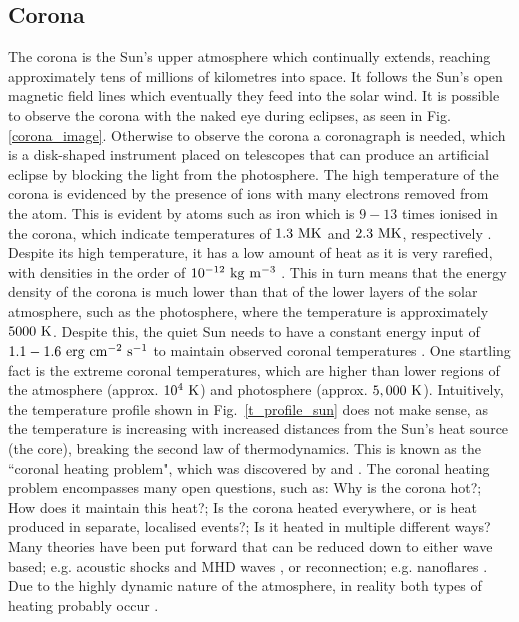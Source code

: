 \subsection{Corona}
\label{ssec:corona}
The corona is the Sun's upper atmosphere which continually extends, reaching approximately tens of millions of kilometres into space. It follows the Sun's open magnetic field lines which eventually they feed into the solar wind. It is possible to observe the corona with the naked eye during eclipses, as seen in Fig. \ref{corona_image}. Otherwise to observe the corona a coronagraph is needed, which is a disk-shaped instrument placed on telescopes that can produce an artificial eclipse by blocking the light from the photosphere. The high temperature of the corona is evidenced by the presence of ions with many electrons removed from the atom. This is evident by atoms such as iron which is $9-13$ times ionised in the corona, which indicate temperatures of $1.3~\rm{MK}$ and $2.3~\rm{MK}$, respectively \citep{Grotrian1939,Edl1943}. Despite its high temperature, it has a low amount of heat as it is very rarefied, with densities in the order of $10^{-12}~\rm{kg~m^{-3}}$ \citep{priest2014magnetohydrodynamics}. This in turn means that the energy density of the corona is much lower than that of the lower layers of the solar atmosphere, such as the photosphere, where the temperature is approximately $5000~\rm{K}$. Despite this, the quiet Sun needs to have a constant energy input of $1.1-1.6~\rm{erg~cm^{-2}~s^{-1}}$ to maintain observed coronal temperatures \citep{Sakurai2017PJAB9387S}. \np
%
One startling fact is the extreme coronal temperatures, which are higher than lower regions of the atmosphere (approx. $10^4~\rm{K}$) and photosphere (approx. $5,000~\rm{K}$). Intuitively, the temperature profile shown in Fig.~\ref{t_profile_sun} does not make sense, as the temperature is increasing with increased distances from the Sun's heat source (the core), breaking the second law of thermodynamics. This is known as the ``coronal heating problem", which was discovered by \cite{Grotrian1939} and \cite{Edl1943}. The coronal heating problem encompasses many open questions, such as: Why is the corona hot?; How does it maintain this heat?; Is the corona heated everywhere, or is heat produced in separate, localised events?; Is it heated in multiple different ways? Many theories have been put forward that can be reduced down to either wave based; e.g. acoustic shocks and MHD waves \citep{Alfv1947MNRAS107211A, Uchida1974SoPh35451U, Wentzel1974SoPh39129W, Priest1998Natur393545P, Hollweg1982ApJ254806H, Antolin2008IAUS247279A, Escande2019NatSR914274E}, or reconnection; e.g. nanoflares \citep{Parker1988ApJ330474P, Cargill1993SoPh147263C, Parnell2000ApJ529554P, Klimchuk2001ApJ553440K,  Cargill2004ApJ605911C, Antolin2021NatAs554A}. Due to the highly dynamic nature of the atmosphere, in reality both types of heating probably occur \citep{Zirker1993SoPh14843Z,Parnell2012RSPTA3703217P}. \np
